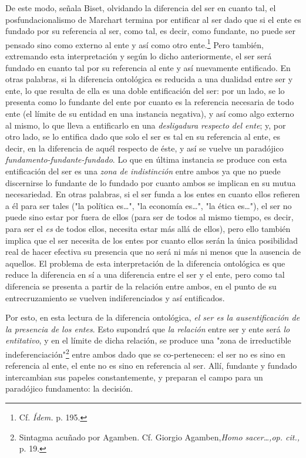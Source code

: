 De este modo, señala Biset, olvidando la diferencia del ser en cuanto
tal, el posfundacionalismo de Marchart termina por entificar al ser dado
que si el ente es fundado por su referencia al ser, como tal, es decir,
como fundante, no puede ser pensado sino como externo al ente y así como
otro ente.\footnote{Cf. \emph{Ídem.} p. 195.} Pero también, extremando
esta interpretación y según lo dicho anteriormente, el ser será fundado
en cuanto tal por su referencia al ente y así nuevamente entificado. En
otras palabras, si la diferencia ontológica es reducida a una dualidad
entre ser y ente, lo que resulta de ella es una doble entificación del
ser: por un lado, se lo presenta como lo fundante del ente por cuanto es
la referencia necesaria de todo ente (el límite de su entidad en una
instancia negativa), y así como algo externo al mismo, lo que lleva a
entificarlo en una \emph{desligadura respecto del ente}; y, por otro
lado, se lo entifica dado que solo el ser es tal en su referencia al
ente, es decir, en la diferencia de aquél respecto de éste, y así se
vuelve un paradójico \emph{fundamento-fundante-fundado}. Lo que en
última instancia se produce con esta entificación del ser es una
\emph{zona de indistinción} entre ambos ya que no puede discernirse lo
fundante de lo fundado por cuanto ambos se implican en su mutua
necesariedad. En otras palabras, si el ser funda a los entes en cuanto
ellos refieren a él para ser tales ("la política es\ldots", "la economía
es\ldots", "la ética es\ldots"), el ser no puede sino estar por fuera de
ellos (para ser de todos al mismo tiempo, es decir, para ser el
\emph{es} de todos ellos, necesita estar más allá de ellos), pero ello
también implica que el ser necesita de los entes por cuanto ellos serán
la única posibilidad real de hacer efectiva su presencia que no será ni
más ni menos que la ausencia de aquellos. El problema de esta
interpretación de la diferencia ontológica es que reduce la diferencia
en sí a una diferencia entre el ser y el ente, pero como tal diferencia
se presenta a partir de la relación entre ambos, en el punto de su
entrecruzamiento se vuelven indiferenciados y así entificados.

Por esto, en esta lectura de la diferencia ontológica, \emph{el ser es
la ausentificación de la presencia de los entes}. Esto supondrá que
\emph{la relación} entre ser y ente será \emph{lo entitativo}, y en el
límite de dicha relación, se produce una "zona de irreductible
indeferenciación"\footnote{Sintagma acuñado por Agamben. Cf. Giorgio
  Agamben,\emph{Homo sacer\ldots,op. cit.,} p. 19.} entre ambos dado que
se co-pertenecen: el ser no es sino en referencia al ente, el ente no es
sino en referencia al ser. Allí, fundante y fundado intercambian sus
papeles constantemente, y preparan el campo para un paradójico
fundamento: la decisión.

